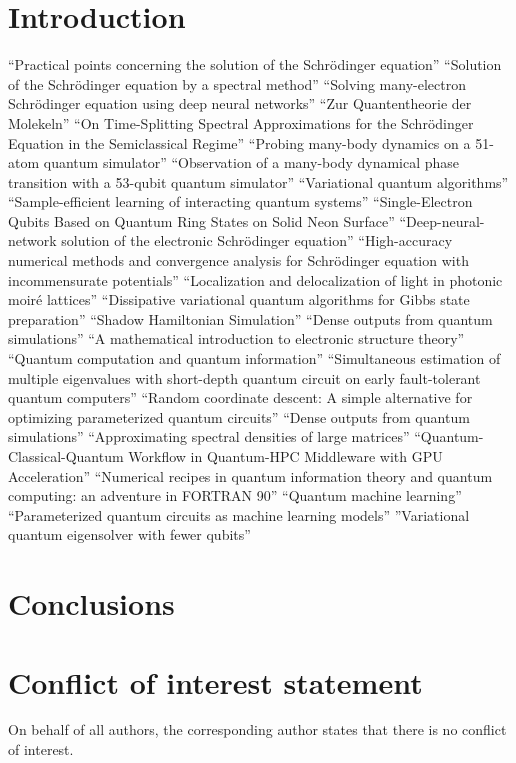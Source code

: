 \documentclass[]{article}
\begin{document}
\section{Introduction}
\cite{BLATT1967382}
``Practical points concerning the solution of the Schrödinger equation''
\cite{FEIT1982412}
``Solution of the Schrödinger equation by a spectral method''
\cite{HAN2019108929}
``Solving many-electron Schrödinger equation using deep neural networks''
\cite{https://doi.org/10.1002/andp.19273892002}
``Zur Quantentheorie der Molekeln''
\cite{BAO2002487}
``On Time-Splitting Spectral Approximations for the Schrödinger Equation in the Semiclassical Regime''
\cite{bernien2017probing}
``Probing many-body dynamics on a 51-atom quantum simulator''
\cite{zhang2017observation}
``Observation of a many-body dynamical phase transition with a 53-qubit quantum simulator''
\cite{cerezo2021variational}
``Variational quantum algorithms''
\cite{anshu2021sample}
``Sample-efficient learning of interacting quantum systems''
\cite{PhysRevLett.132.250603}
``Single-Electron Qubits Based on Quantum Ring States on Solid Neon Surface''
\cite{hermann2020deep}
``Deep-neural-network solution of the electronic Schr{\"o}dinger equation''
\cite{jiang2024high}
``High-accuracy numerical methods and convergence analysis for Schr{\"o}dinger equation with incommensurate potentials''
\cite{wang2020localization}
``Localization and delocalization of light in photonic moir{\'e} lattices''
\cite{ilin2024dissipativevariationalquantumalgorithms}
``Dissipative variational quantum algorithms for Gibbs state preparation''
\cite{somma2024shadowhamiltoniansimulation}
``Shadow Hamiltonian Simulation''
\cite{LIU2024113213}
``Dense outputs from quantum simulations''
\cite{lin2019mathematical}
``A mathematical introduction to electronic structure theory''
\cite{nielsen2010quantum}
``Quantum computation and quantum information''
\cite{ding2023simultaneous}
``Simultaneous estimation of multiple eigenvalues with short-depth quantum circuit on early fault-tolerant quantum computers''
\cite{ding2024random}
  ``Random coordinate descent: A simple alternative for optimizing parameterized quantum circuits''
\cite{LIU2024113213}
``Dense outputs from quantum simulations''
\cite{lin2016approximating}
``Approximating spectral densities of large matrices''
\cite{10628380}
``Quantum-Classical-Quantum Workflow in Quantum-HPC Middleware with GPU Acceleration''
\cite{ramkarthik2021numerical}
``Numerical recipes in quantum information theory and quantum computing: an adventure in FORTRAN 90''
\cite{biamonte2017quantum}
``Quantum machine learning''
\cite{Benedetti_2019}
``Parameterized quantum circuits as machine learning models''
\cite{PhysRevResearch.1.023025}
''Variational quantum eigensolver with fewer qubits''



\section{Conclusions}


\section{Conflict of interest statement }

On behalf of all authors, the corresponding author states that there is no conflict of interest.


\end{document}
